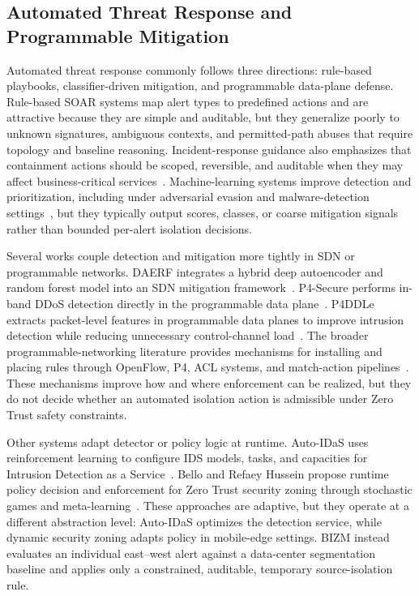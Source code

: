 \documentclass[final,5p]{elsarticle}
\begin{document}
\subsection{Automated Threat Response and Programmable Mitigation}
\label{sec:rw_threat_response}

Automated threat response commonly follows three directions: rule-based playbooks, classifier-driven mitigation, and programmable data-plane defense. Rule-based SOAR systems map alert types to predefined actions and are attractive because they are simple and auditable, but they generalize poorly to unknown signatures, ambiguous contexts, and permitted-path abuses that require topology and baseline reasoning. Incident-response guidance also emphasizes that containment actions should be scoped, reversible, and auditable when they may affect business-critical services~\cite{cichonski2012incident,nelson2025incident,belhaj2023cybersecurityautomation}. Machine-learning systems improve detection and prioritization, including under adversarial evasion and malware-detection settings~\cite{jAA-IDS25,cAPELID-ATH25,jMDOB25,jHybridWSD23}, but they typically output scores, classes, or coarse mitigation signals rather than bounded per-alert isolation decisions.

Several works couple detection and mitigation more tightly in SDN or programmable networks. DAERF integrates a hybrid deep autoencoder and random forest model into an SDN mitigation framework~\cite{mhamdi2024daerf}. P4-Secure performs in-band DDoS detection directly in the programmable data plane~\cite{manocchio2025p4secure}. P4DDLe extracts packet-level features in programmable data planes to improve intrusion detection while reducing unnecessary control-channel load~\cite{doriguzzi2024packet}. The broader programmable-networking literature provides mechanisms for installing and placing rules through OpenFlow, P4, ACL systems, and match-action pipelines~\cite{mckeown2008openflow,bosshart2014p4,farhady2015software,ghasemi2022portcatcher}. These mechanisms improve how and where enforcement can be realized, but they do not decide whether an automated isolation action is admissible under Zero Trust safety constraints.

Other systems adapt detector or policy logic at runtime. Auto-IDaS uses reinforcement learning to configure IDS models, tasks, and capacities for Intrusion Detection as a Service~\cite{lin2024autoidas}. Bello and Refaey Hussein propose runtime policy decision and enforcement for Zero Trust security zoning through stochastic games and meta-learning~\cite{bello2025dynamic}. These approaches are adaptive, but they operate at a different abstraction level: Auto-IDaS optimizes the detection service, while dynamic security zoning adapts policy in mobile-edge settings. BIZM instead evaluates an individual east--west alert against a data-center segmentation baseline and applies only a constrained, auditable, temporary source-isolation rule.
\end{document}

